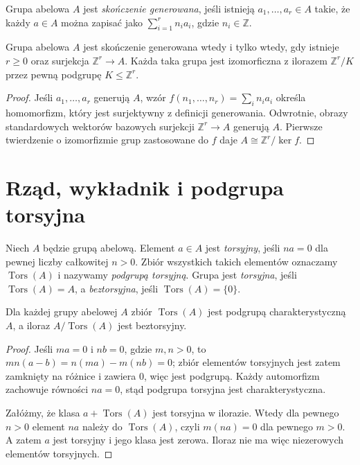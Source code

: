 \begin{definicja}
\label{aa:def:abelian-fg}
Grupa abelowa $A$ jest \emph{skończenie generowana}, jeśli
istnieją $a_1,\ldots,a_r\in A$ takie, że każdy $a\in A$
można zapisać jako $\sum_{i=1}^r n_i a_i$,
gdzie $n_i\in\mathbb Z$.
\end{definicja}
\begin{lemat}
\label{aa:lem:abelian-fg-quotient}
Grupa abelowa $A$ jest skończenie generowana wtedy i tylko wtedy,
gdy istnieje $r\ge0$ oraz surjekcja $\mathbb Z^r\to A$.
Każda taka grupa jest izomorficzna z ilorazem
$\mathbb Z^r/K$ przez pewną podgrupę $K\le\mathbb Z^r$.
\end{lemat}
\begin{proof}
Jeśli $a_1,\ldots,a_r$ generują $A$, wzór
$f(n_1,\ldots,n_r)=\sum_i n_i a_i$ określa homomorfizm,
który jest surjektywny z definicji generowania.
Odwrotnie, obrazy standardowych wektorów bazowych
surjekcji $\mathbb Z^r\to A$ generują $A$.
Pierwsze twierdzenie o izomorfizmie grup zastosowane do
$f$ daje $A\cong\mathbb Z^r/\ker f$.
\end{proof}

\section{Rząd, wykładnik i podgrupa torsyjna}
\begin{definicja}[Torsja]
\label{aa:def:abelian-torsion}
Niech $A$ będzie grupą abelową.
Element $a\in A$ jest \emph{torsyjny}, jeśli $na=0$
dla pewnej liczby całkowitej $n>0$.
Zbiór wszystkich takich elementów oznaczamy
$\operatorname{Tors}(A)$ i nazywamy \emph{podgrupą torsyjną}.
Grupa jest \emph{torsyjna}, jeśli $\operatorname{Tors}(A)=A$,
a \emph{beztorsyjna}, jeśli $\operatorname{Tors}(A)=\{0\}$.
\end{definicja}
\begin{lemat}
\label{aa:lem:torsion-characteristic}
Dla każdej grupy abelowej $A$ zbiór $\operatorname{Tors}(A)$
jest podgrupą charakterystyczną $A$, a iloraz
$A/\operatorname{Tors}(A)$ jest beztorsyjny.
\end{lemat}
\begin{proof}
Jeśli $ma=0$ i $nb=0$, gdzie $m,n>0$, to
$mn(a-b)=n(ma)-m(nb)=0$; zbiór elementów torsyjnych
jest zatem zamknięty na różnice i zawiera $0$, więc jest
podgrupą. Każdy automorfizm zachowuje równości $na=0$,
stąd podgrupa torsyjna jest charakterystyczna.

Załóżmy, że klasa $a+\operatorname{Tors}(A)$ jest torsyjna
w ilorazie. Wtedy dla pewnego $n>0$ element $na$ należy
do $\operatorname{Tors}(A)$, czyli $m(na)=0$ dla pewnego $m>0$.
A zatem $a$ jest torsyjny i jego klasa jest zerowa.
Iloraz nie ma więc niezerowych elementów torsyjnych.
\end{proof}

